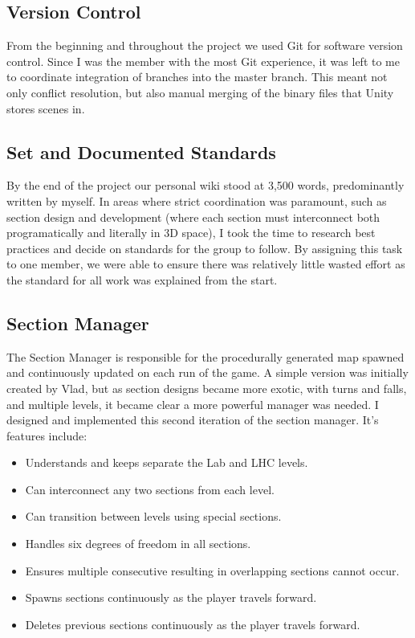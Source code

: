 \documentclass[a4paper,oneside]{memoir}
\begin{document}
			\subsection{Version Control}

				From the beginning and throughout the project we used Git for software version control. Since I was the member with the most Git experience, it was left to me to coordinate integration of branches into the master branch. This meant not only conflict resolution, but also manual merging of the binary files that Unity stores scenes in.

			\subsection{Set and Documented Standards}

				By the end of the project our personal wiki stood at 3,500 words, predominantly written by myself. In areas where strict coordination was paramount, such as section design and development (where each section must interconnect both programatically and literally in 3D space), I took the time to research best practices and decide on standards for the group to follow. By assigning this task to one member, we were able to ensure there was relatively little wasted effort as the standard for all work was explained from the start.

			\subsection{Section Manager}

				The Section Manager is responsible for the procedurally generated map spawned and continuously updated on each run of the game. A simple version was initially created by Vlad, but as section designs became more exotic, with turns and falls, and multiple levels, it became clear a more powerful manager was needed. I designed and implemented this second iteration of the section manager. It's features include: 

				\begin{itemize}
					\item Understands and keeps separate the Lab and LHC levels.
					\item Can interconnect any two sections from each level.
					\item Can transition between levels using special sections.
					\item Handles six degrees of freedom in all sections.
					\item Ensures multiple consecutive resulting in overlapping sections cannot occur.
					\item Spawns sections continuously as the player travels forward.
					\item Deletes previous sections continuously as the player travels forward.
				\end{itemize}
\end{document}

